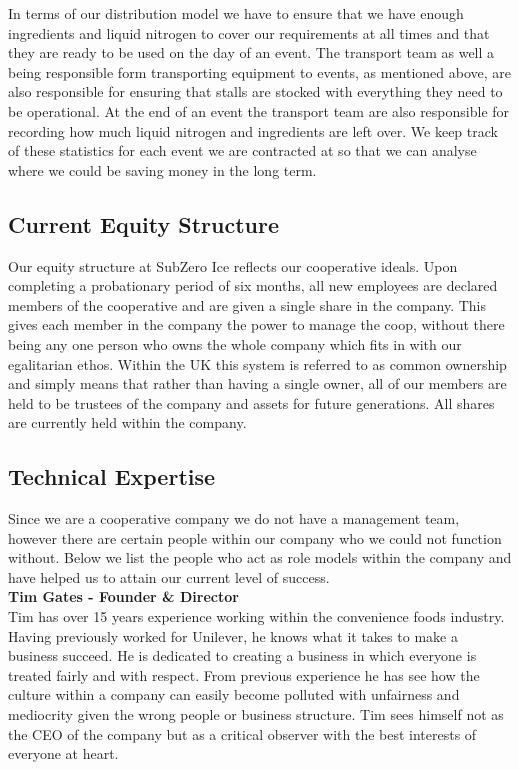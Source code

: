 \documentclass{article}
\begin{document}
  In terms of our distribution model we have to ensure that we have enough ingredients and liquid nitrogen to cover our requirements at all times and that they are ready to be used on the day of an event. The transport team as well a being responsible form transporting equipment to events, as mentioned above, are also responsible for ensuring that stalls are stocked with everything they need to be operational. At the end of an event the transport team are also responsible for recording how much liquid nitrogen and ingredients are left over. We keep track of these statistics for each event we are contracted at so that we can analyse where we could be saving money in the long term.
  

  \subsection{Current Equity Structure}

  Our equity structure at SubZero Ice reflects our cooperative ideals. Upon completing a probationary period of six months, all new employees are declared members of the cooperative and are given a single share in the company. This gives each member in the company the power to manage the coop, without there being any one person who owns the whole company which fits in with our egalitarian ethos. Within the UK this system is referred to as common ownership and simply means that rather than having a single owner, all of our members are held to be trustees of the company and assets for future generations. All shares are currently held within the company.

  \subsection{Technical Expertise}

  Since we are a cooperative company we do not have a management team, however there are certain people within our company who we could not function without. Below we list the people who act as role models within the company and have helped us to attain our current level of success. \\

  {\bf Tim Gates - Founder \& Director} \\
  Tim has over 15 years experience working within the convenience foods industry. Having previously worked for Unilever, he knows what it takes to make a business succeed. He is dedicated to creating a business in which everyone is treated fairly and with respect. From previous experience he has see how the culture within a company can easily become polluted with unfairness and mediocrity given the wrong people or business structure. Tim sees himself not as the CEO of the company but as a critical observer with the best interests of everyone at heart. \\
\end{document}
